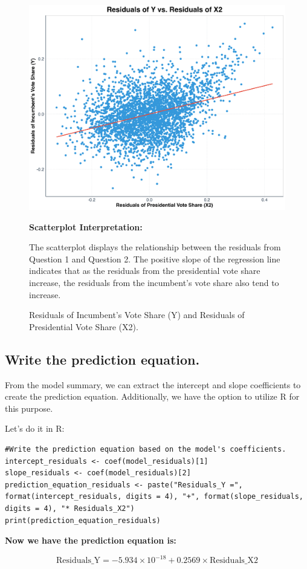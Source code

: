 \documentclass[12pt]{article}
\begin{document}
\begin{figure}[h!]
    \centering
    \includegraphics[width=.75\textwidth]{scatterplot_residuals_regression_line.png}
    \caption{\footnotesize Residuals of Incumbent's Vote Share (Y) and Residuals of Presidential Vote Share (X2).}
    \label{fig:plot_4}
    \smallskip
    \raggedright
    \textbf{Scatterplot Interpretation:}

    The scatterplot displays the relationship between the residuals from Question 1 and Question 2. The positive slope of the regression line indicates that as the residuals from the presidential vote share increase, the residuals from the incumbent's vote share also tend to increase.
\end{figure} 
\subsection{Write the prediction equation.}

From the model summary, we can extract the intercept and slope coefficients to create the prediction equation. Additionally, we have the option to utilize R for this purpose.

Let's do it in R:
\begin{lstlisting}
#Write the prediction equation based on the model's coefficients.
intercept_residuals <- coef(model_residuals)[1]
slope_residuals <- coef(model_residuals)[2]
prediction_equation_residuals <- paste("Residuals_Y =", format(intercept_residuals, digits = 4), "+", format(slope_residuals, digits = 4), "* Residuals_X2")
print(prediction_equation_residuals)
\end{lstlisting}
\textbf{Now we have the prediction equation is:}

\begin{equation}
\text{Residuals\_Y} = -5.934 \times 10^{-18} + 0.2569 \times \text{Residuals\_X2}
\end{equation}
\end{document}
